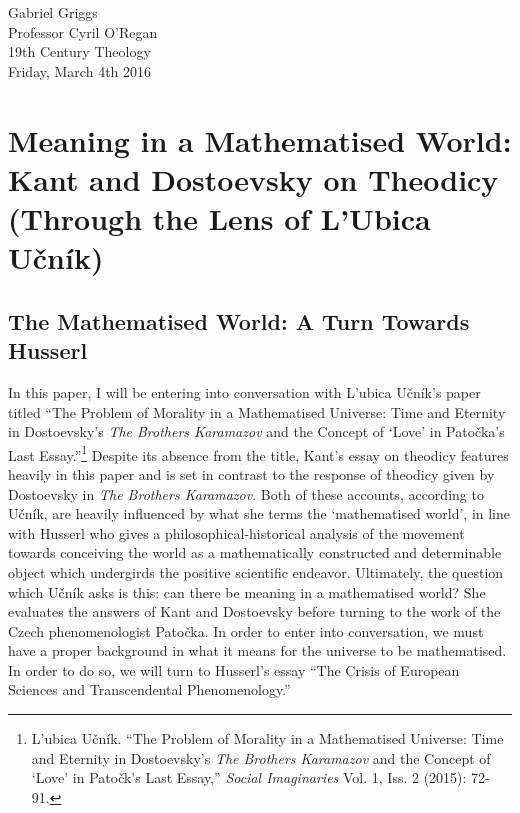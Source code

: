 \documentclass[12pt]{article}
\begin{document}
\singlespacing
{\raggedleft{}Gabriel Griggs} \\
Professor Cyril O'Regan \\
19th Century Theology \\
Friday, March 4th 2016\\

\section*{Meaning in a Mathematised World: Kant and Dostoevsky on Theodicy (Through the Lens of L'Ubica U\v{c}n\'{i}k)}

\doublespacing
\subsection*{The Mathematised World: A Turn Towards Husserl}

In this paper, I will be entering into conversation with L'ubica U\v{c}n\'{i}k's paper titled ``The Problem of Morality in a Mathematised Universe: Time and Eternity in Dostoevsky's \emph{The Brothers Karamazov} and the Concept of `Love' in Pato\v{c}ka's Last Essay.''\footnote{L'ubica U\v{c}n\'{i}k. ``The Problem of Morality in a Mathematised Universe: Time and Eternity in Dostoevsky's \emph{The Brothers Karamazov} and the Concept of `Love' in Pato\v{c}k's Last Essay,'' \emph{Social Imaginaries} Vol. 1, Iss. 2 (2015): 72-91.} Despite its absence from the title, Kant's essay on theodicy features heavily in this paper and is set in contrast to the response of theodicy given by Dostoevsky in \emph{The Brothers Karamazov}. Both of these accounts, according to U\v{c}n\'{i}k, are heavily influenced by what she terms the `mathematised world', in line with Husserl who gives a philosophical-historical analysis of the movement towards conceiving the world as a mathematically constructed and determinable object which undergirds the positive scientific endeavor. Ultimately, the question which U\v{c}n\'{i}k asks is this: can there be meaning in a mathematised world? She evaluates the answers of Kant and Dostoevsky before turning to the work of the Czech phenomenologist Pato\v{c}ka. In order to enter into conversation, we must have a proper background in what it means for the universe to be mathematised. In order to do so, we will turn to Husserl's essay ``The Crisis of European Sciences and Transcendental Phenomenology.'' 
\end{document}
